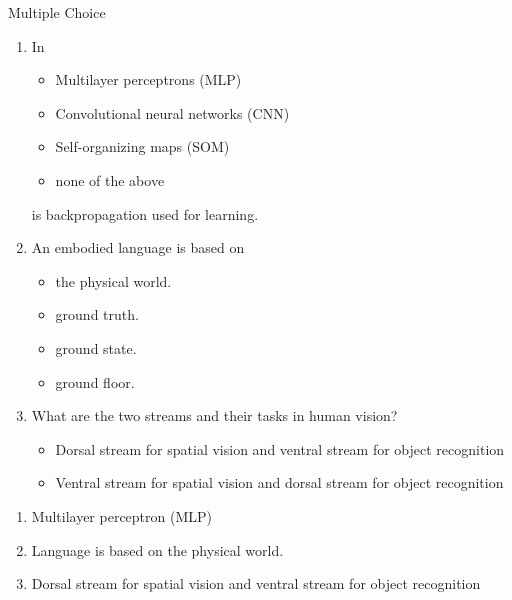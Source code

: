 \documentclass{article}
\begin{document}
\begin{exercise}{Multiple Choice}
  \begin{enumerate}
    \item In 
      \begin{itemize}
        \item Multilayer perceptrons (MLP)
        \item Convolutional neural networks (CNN)
        \item Self-organizing maps (SOM)
        \item none of the above
      \end{itemize}
        is backpropagation used for learning.

    \item An embodied language is based on
      \begin{itemize}
        \item the physical world.
        \item ground truth.
        \item ground state.
        \item ground floor.
      \end{itemize}

    \item What are the two streams and their tasks in human vision?
      \begin{itemize}
        \item Dorsal stream for spatial vision and ventral stream for object recognition
        \item Ventral stream for spatial vision and dorsal stream for object recognition
      \end{itemize}
  \end{enumerate}

  \begin{solution}
    \begin{enumerate}
      \item Multilayer perceptron (MLP)
      \item Language is based on the physical world.
      \item Dorsal stream for spatial vision and ventral stream for object recognition
    \end{enumerate}
  \end{solution}
\end{exercise}
\end{document}
